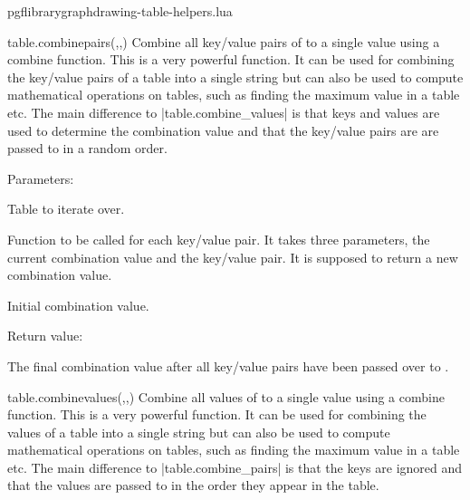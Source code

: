 
\begin{filedescription}{pgflibrarygraphdrawing-table-helpers.lua}


\begin{luacommand}{{table.combine\textunderscore{}pairs}(,,)}
Combine all key/value pairs of  to a single value using a combine function.  This is a very powerful function. It can be used for combining the key/value pairs of a table into a single string but can also be used to compute mathematical operations on tables, such as finding the maximum value in a table etc.  The main difference to |table.combine_values| is that keys and values are used to determine the combination value and that the key/value pairs are are passed to  in a random order. 

Parameters:
\begin{parameterdescription}
	\item[\meta{table}] Table to iterate over.\item[\meta{combine\_func}] Function to be called for each key/value pair. It takes three parameters, the current combination value and the key/value pair. It is supposed to return a new combination value.\item[\meta{initial\_value}] Initial combination value. 
\end{parameterdescription}


Return value:
\begin{parameterdescription} 
  \item[] The final combination value after all key/value pairs have been passed over to . 
\end{parameterdescription}


\end{luacommand}
\begin{luacommand}{{table.combine\textunderscore{}values}(,,)}
Combine all values of  to a single value using a combine function.  This is a very powerful function. It can be used for combining the values of a table into a single string but can also be used to compute mathematical operations on tables, such as finding the maximum value in a table etc.  The main difference to |table.combine_pairs| is that the keys are ignored and that the values are passed to  in the order they appear in the table. 


\end{luacommand}
\end{filedescription}
